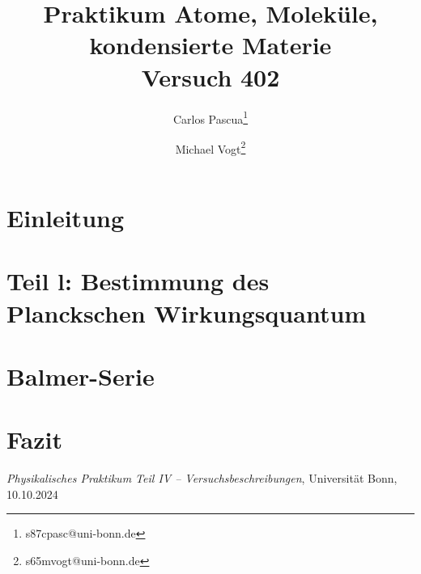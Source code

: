 \documentclass{article}
\title{Praktikum Atome, Moleküle, kondensierte Materie \\ Versuch 402}
\author[1]{Carlos Pascua\thanks{s87cpasc@uni-bonn.de}}
\author[1]{Michael Vogt\thanks{s65mvogt@uni-bonn.de}}
\affil[1]{Uni Bonn}
\begin{document}
\maketitle
\tableofcontents
\newpage
{}

\pagestyle{fancy}
\fancyhead[R]{\thepage}
\fancyhead[L]{\leftmark}

\section*{Einleitung}


\section{Teil l: Bestimmung des Planckschen Wirkungsquantum}

\section{Balmer-Serie}

\clearpage
\section{Fazit}


\clearpage
\begin{thebibliography}{9}

\textit{Physikalisches Praktikum Teil IV -- Versuchsbeschreibungen}, Universität Bonn, 10.10.2024


\end{thebibliography}
\end{document}
